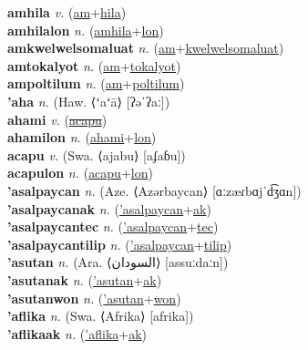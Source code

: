 \textbf{amhila} \textit{v.} (\hyperref[am]{am}+\hyperref[hila]{hila})
 \label{amhila} \\
\textbf{amhilalon} \textit{n.} (\hyperref[amhila]{amhila}+\hyperref[lon]{lon})
 \label{amhilalon} \\
\textbf{amkwelwelsomaluat} \textit{n.} (\hyperref[am]{am}+\hyperref[kwelwelsomaluat]{kwelwelsomaluat})
 \label{amkwelwelsomaluat} \\
\textbf{amtokalyot} \textit{n.} (\hyperref[am]{am}+\hyperref[tokalyot]{tokalyot})
 \label{amtokalyot} \\
\textbf{ampoltilum} \textit{n.} (\hyperref[am]{am}+\hyperref[poltilum]{poltilum})
 \label{ampoltilum} \\
\textbf{'aha} \textit{n.} (Haw. ⟨ʻaʻā⟩ [ʔəˈʔaː])
 \label{'aha} \\
\textbf{ahami} \textit{v.} (\hyperref[acapu]{\sout{acapu}})
 \label{ahami} \\
\textbf{ahamilon} \textit{n.} (\hyperref[ahami]{ahami}+\hyperref[lon]{lon})
 \label{ahamilon} \\
\textbf{acapu} \textit{v.} (Swa. ⟨ajabu⟩ [aʄaɓu])
 \label{acapu} \\
\textbf{acapulon} \textit{n.} (\hyperref[acapu]{acapu}+\hyperref[lon]{lon})
 \label{acapulon} \\
\textbf{'asalpaycan} \textit{n.} (Aze. ⟨Azərbaycan⟩ [ɑːzæɾbɑjˈd͡ʒɑn])
 \label{'asalpaycan} \\
\textbf{'asalpaycanak} \textit{n.} (\hyperref['asalpaycan]{'asalpaycan}+\hyperref[ak]{ak})
 \label{'asalpaycanak} \\
\textbf{'asalpaycantec} \textit{n.} (\hyperref['asalpaycan]{'asalpaycan}+\hyperref[tec]{tec})
 \label{'asalpaycantec} \\
\textbf{'asalpaycantilip} \textit{n.} (\hyperref['asalpaycan]{'asalpaycan}+\hyperref[tilip]{tilip})
 \label{'asalpaycantilip} \\
\textbf{'asutan} \textit{n.} (Ara. ⟨السودان‎⟩ [assuːdaːn])
 \label{'asutan} \\
\textbf{'asutanak} \textit{n.} (\hyperref['asutan]{'asutan}+\hyperref[ak]{ak})
 \label{'asutanak} \\
\textbf{'asutanwon} \textit{n.} (\hyperref['asutan]{'asutan}+\hyperref[won]{won})
 \label{'asutanwon} \\
\textbf{'aflika} \textit{n.} (Swa. ⟨Afrika⟩ [afrika])
 \label{'aflika} \\
\textbf{'aflikaak} \textit{n.} (\hyperref['aflika]{'aflika}+\hyperref[ak]{ak})
 \label{'aflikaak} \\
